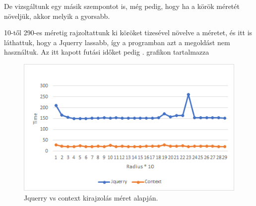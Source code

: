 De vizsgáltunk egy másik szempontot is, még pedig, hogy ha a körök méretét növeljük, akkor melyik a gyorsabb. 

10-től 290-es méretig rajzoltattunk ki köröket tizesével növelve a méretet, és itt is láthattuk, hogy a Jquerry lassabb, így a programban azt a megoldást nem használtuk. Az itt kapott futási időket pedig . grafikon tartalmazza

\begin{figure}[h]
	\centering
	\includegraphics[scale=1]{images/radius.png}
	\caption{Jquerry vs context kirajzolás méret alapján.}
	\label{fig:radius}
\end{figure}
